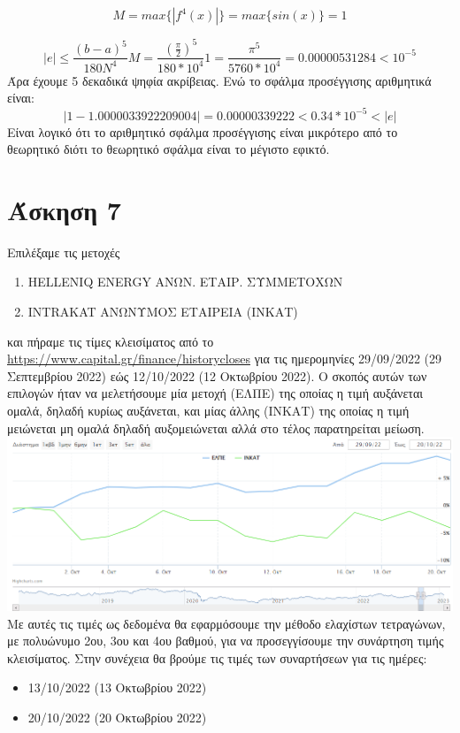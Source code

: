 \documentclass[a4paper,11pt]{article}
\newcommand{\gt}{\greektext}
\newcommand{\lt}{\latintext}
\begin{document}
\begin{equation*}
M = max\{|f^{4}(x)|\} = max\{sin(x)\} = 1
\end{equation*}

\begin{equation*}
|e| \leq \frac{(b-a)^5}{180N^4}M 
= \frac{(\frac{\pi}{2})^5}{180*10^4}1 
= \frac{\pi^5}{5760*10^4} 
= 0.00000531284 < 10^{-5}
\end{equation*}
Άρα έχουμε 5 δεκαδικά ψηφία ακρίβειας.
Ενώ το σφάλμα προσέγγισης αριθμητικά είναι: 
\begin{equation*}
|1 - 1.0000033922209004| = 
0.00000339222 < 0.34 *10^{-5} < |e|
\end{equation*}
Είναι λογικό ότι το αριθμητικό σφάλμα προσέγγισης είναι μικρότερο από το θεωρητικό διότι το θεωρητικό σφάλμα είναι το μέγιστο εφικτό.

\newpage
\section{Άσκηση 7}
Επιλέξαμε τις μετοχές \\
\begin{enumerate}
\item \lt HELLENIQ ENERGY \gt ΑΝΩΝ. ΕΤΑΙΡ. ΣΥΜΜΕΤΟΧΩΝ 
\item \lt INTRAKAT \gt ΑΝΩΝΥΜΟΣ ΕΤΑΙΡΕΙΑ (ΙΝΚΑΤ)\end{enumerate}
και πήραμε τις τίμες κλεισίματος από το \lt
\url{https://www.capital.gr/finance/historycloses} \gt
για τις ημερομηνίες 29/09/2022 (29 Σεπτεμβρίου 2022) εώς 12/10/2022 (12 Οκτωβρίου 2022). Ο σκοπός αυτών των επιλογών ήταν να μελετήσουμε μία μετοχή (ΕΛΠΕ) της οποίας η τιμή αυξάνεται ομαλά, δηλαδή κυρίως αυξάνεται, και μίας άλλης (ΙΝΚΑΤ) της οποίας η τιμή μειώνεται μη ομαλά δηλαδή αυξομειώνεται αλλά στο τέλος παρατηρείται μείωση. \\
\includegraphics[scale=0.48]{stocks.png}
Με αυτές τις τιμές ως δεδομένα θα εφαρμόσουμε την μέθοδο ελαχίστων τετραγώνων, με πολυώνυμο 2ου, 3ου και 4ου βαθμού, για να προσεγγίσουμε την συνάρτηση τιμής κλεισίματος. Στην συνέχεια θα βρούμε τις τιμές των συναρτήσεων για τις ημέρες: \begin{itemize}
\item 13/10/2022 (13 Οκτωβρίου 2022) 
\item  20/10/2022 (20 Οκτωβρίου 2022)
\end{itemize}
\end{document}
